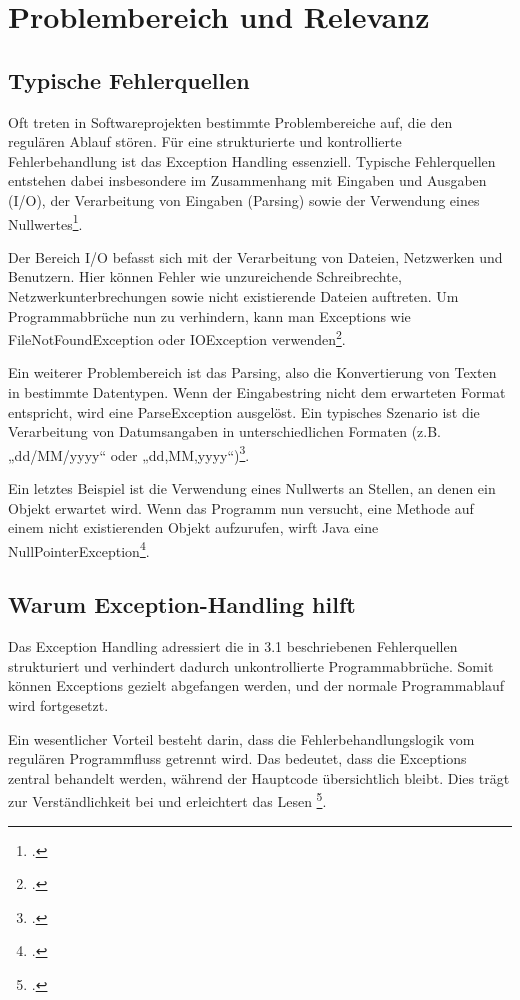 \section{Problembereich und Relevanz}
\subsection{Typische Fehlerquellen}
Oft treten in Softwareprojekten bestimmte Problembereiche auf, die den regulären Ablauf stören. Für eine strukturierte und kontrollierte Fehlerbehandlung ist das Exception Handling essenziell.
Typische Fehlerquellen entstehen dabei insbesondere im Zusammenhang mit Eingaben und Ausgaben (I/O), der Verarbeitung von Eingaben (Parsing) sowie der Verwendung eines Nullwertes\footcite[Vgl.][]{9_CJE}.
 
Der Bereich I/O befasst sich mit der Verarbeitung von Dateien, Netzwerken und Benutzern. Hier können Fehler wie unzureichende Schreibrechte, Netzwerkunterbrechungen sowie nicht existierende Dateien auftreten. Um Programmabbrüche nun zu verhindern, kann man Exceptions wie FileNotFoundException oder IOException verwenden\footcite[Vgl.][]{9_CJE}.
 
Ein weiterer Problembereich ist das Parsing, also die Konvertierung von Texten in bestimmte Datentypen. Wenn der Eingabestring nicht dem erwarteten Format entspricht, wird eine ParseException ausgelöst. Ein typisches Szenario ist die Verarbeitung von Datumsangaben in unterschiedlichen Formaten (z.B. „dd/MM/yyyy“ oder „dd,MM,yyyy“)\footcite[Vgl.][]{9_CJE}.
 
Ein letztes Beispiel ist die Verwendung eines Nullwerts an Stellen, an denen ein Objekt erwartet wird. Wenn das Programm nun versucht, eine Methode auf einem nicht existierenden Objekt aufzurufen, wirft Java eine NullPointerException\footcite[Vgl.][]{9_CJE}.

\subsection{Warum Exception-Handling hilft}
Das Exception Handling adressiert die in 3.1 beschriebenen Fehlerquellen strukturiert und verhindert dadurch unkontrollierte Programmabbrüche. Somit können Exceptions gezielt abgefangen werden, und der normale Programmablauf wird fortgesetzt.
 
Ein wesentlicher Vorteil besteht darin, dass die Fehlerbehandlungslogik vom regulären Programmfluss getrennt wird. Das bedeutet, dass die Exceptions zentral behandelt werden, während der Hauptcode übersichtlich bleibt. Dies trägt zur Verständlichkeit bei und erleichtert das Lesen \footcite[Vgl.][]{10_AOE}.
 
